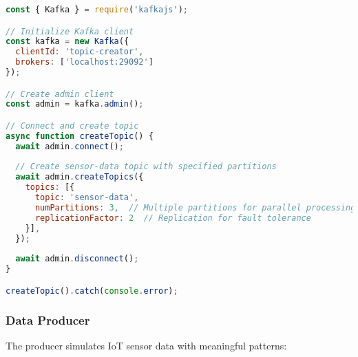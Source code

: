 \documentclass[11pt, a4paper]{article}
\newenvironment{customcode}[1]{
  \begin{tcolorbox}[
    enhanced,
    colback=codebg,
    colframe=codeframe,
    arc=0pt,
    outer arc=0pt,
    boxrule=1pt,
    left=10pt,
    right=10pt,
    top=10pt,
    bottom=10pt,
    title={#1},
    fonttitle=\sffamily\bfseries\color{mainblue},
    coltitle=white,
    colbacktitle=secondaryblue,
    attach boxed title to top left={xshift=10pt, yshift=-\tcboxedtitleheight/2},
    boxed title style={
      sharp corners,
      boxrule=0pt,
    },
  ]
}{
  \end{tcolorbox}
}
\begin{document}
\begin{customcode}{Kafka Topic Creation (JavaScript)}
\begin{lstlisting}[language=JavaScript]
const { Kafka } = require('kafkajs');

// Initialize Kafka client
const kafka = new Kafka({
  clientId: 'topic-creator',
  brokers: ['localhost:29092']
});

// Create admin client
const admin = kafka.admin();

// Connect and create topic
async function createTopic() {
  await admin.connect();
  
  // Create sensor-data topic with specified partitions
  await admin.createTopics({
    topics: [{ 
      topic: 'sensor-data', 
      numPartitions: 3,  // Multiple partitions for parallel processing 
      replicationFactor: 2  // Replication for fault tolerance
    }],
  });
  
  await admin.disconnect();
}

createTopic().catch(console.error);
\end{lstlisting}
\end{customcode}

\subsubsection{Data Producer}
The producer simulates IoT sensor data with meaningful patterns:
\end{document}
